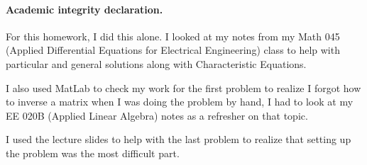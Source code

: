 \documentclass[11pt]{article}
\begin{document}

\vskip 0.2in
\paragraph{Academic integrity declaration.}

For this homework, I did this alone. I looked at my notes from my 
Math 045 (Applied Differential Equations for Electrical Engineering) class
to help with particular and general solutions along with Characteristic Equations.

I also used MatLab to check my work for the first problem to realize I forgot how to inverse a matrix
when I was doing the problem by hand, I had to look at my EE 020B (Applied Linear Algebra) 
notes as a refresher on that topic.

I used the lecture slides to help with the last problem to realize
that setting up the problem was the most difficult part.
\end{document}
